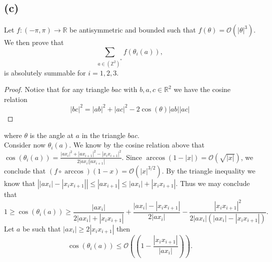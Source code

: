 \documentclass[a4paper,11pt]{article}
\newcommand{\abs}[1]{\left\lvert #1 \right\rvert}
\newcommand{\R}{\mathbb{R}}
\newcommand{\Z}{\mathbb{Z}}
\numberwithin{equation}{section}
\begin{document}
	\subsection*{(c)}
	Let $ f:(-\pi,\pi)\to\R $ be antisymmetric and bounded such that $ f(\theta)=\mathcal{O}(\abs{\theta}^3) $. We then prove that \begin{equation}
	\sum_{a\in(\Z^2)^*}f(\theta_i(a)),
	\end{equation}
	is absolutely summable for $ i=1,2,3 $. \begin{proof}
		Notice that for any triangle $ bac $ with $ b,a,c\in\R^2 $ we have the cosine relation\begin{equation}
		\abs{bc}^2=\abs{ab}^2+\abs{ac}^2-2\cos(\theta)\abs{ab}\abs{ac}
		\end{equation}
	\end{proof}
	where $ \theta $ is the angle at $ a $ in the triangle $ bac $. \\
	Consider now $ \theta_i(a) $. We know by the cosine relation above that $ \cos(\theta_i(a))=\frac{\abs{ax_i}^2+\abs{ax_{i+1}}^2-\abs{x_ix_{i+1}}^2}{2\abs{ax_i}\abs{ax_{i+1}}} $. Since $ \arccos(1-\abs{x})=\mathcal{O}(\sqrt{\abs{x}}) $, we conclude that $ (f\circ\arccos)(1-x)=\mathcal{O}(\abs{x}^{3/2}) $. By the triangle inequality we know that $ \abs{\abs{ax_i}-\abs{x_ix_{i+1}}}\leq\abs{ax_{i+1}}\leq\abs{ax_i}+\abs{x_ix_{i+1}} $. Thus we may conclude that \begin{equation}
	1\geq\cos(\theta_i(a))\geq\frac{\abs{ax_i}}{2\abs{ax_i}+\abs{x_ix_{i+1}}}+\frac{\abs{ax_i}-\abs{x_ix_{i+1}}}{2\abs{ax_i}}-\frac{\abs{x_ix_{i+1}}^2}{2\abs{ax_i}(\abs{ax_i}-\abs{x_ix_{i+1}})}.
	\end{equation}
	Let $ a $ be such that $ \abs{ax_i}\geq2\abs{x_ix_{i+1}} $ then\begin{equation}
	\cos(\theta_i(a))\leq\mathcal{O}\left(\left(1-\frac{\abs{x_ix_{i+1}}}{\abs{ax_i}}\right)\right).
	\end{equation}
\end{document}
